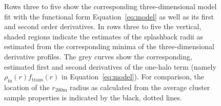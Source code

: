 \documentclass[iop, apjl, twocolappendix, numberedappendix]{emulateapj}
\begin{document}
\begin{figure}
{Rows three to five show the corresponding three-dimensional model fit
with the functional form Equation~\ref{eq:model} as well as its first and
second order derivatives.
In rows three to five the vertical, shaded regions indicate the
estimates of the splashback radii as estimated from the corresponding minima
of the three-dimensional derivative profiles.
The grey curves show the corresponding, estimated first and second derivatives of the
one-halo term (namely $\rho_{\mathrm{in}}(r)f_{\mathrm{trans}}(r)$ in Equation~\ref{eq:model}).
For comparison, the location of the $r_{\mathrm{200m}}$ radius as calculated
from the average cluster sample properties is indicated by the black, dotted
lines.}
   \label{fig:all_graphs}
\end{figure}

\end{document}
